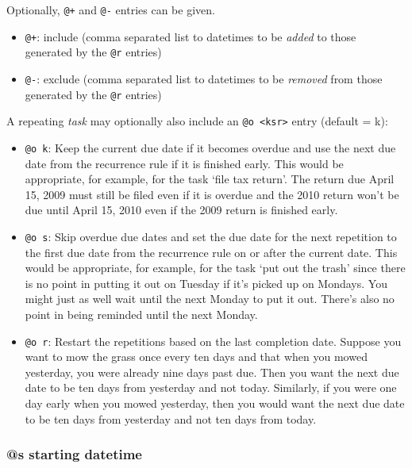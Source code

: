 \documentclass[]{article}
\begin{document}
Optionally, \texttt{@+} and \texttt{@-} entries can be given.

\begin{itemize}
\item
  \texttt{@+}: include (comma separated list to datetimes to be
  \emph{added} to those generated by the \texttt{@r} entries)
\item
  \texttt{@-}: exclude (comma separated list to datetimes to be
  \emph{removed} from those generated by the \texttt{@r} entries)
\end{itemize}

A repeating \emph{task} may optionally also include an
\texttt{@o \textless{}k\textbar{}s\textbar{}r\textgreater{}} entry
(default = k):

\begin{itemize}
\item
  \texttt{@o k}: Keep the current due date if it becomes overdue and use
  the next due date from the recurrence rule if it is finished early.
  This would be appropriate, for example, for the task `file tax
  return'. The return due April 15, 2009 must still be filed even if it
  is overdue and the 2010 return won't be due until April 15, 2010 even
  if the 2009 return is finished early.
\item
  \texttt{@o s}: Skip overdue due dates and set the due date for the
  next repetition to the first due date from the recurrence rule on or
  after the current date. This would be appropriate, for example, for
  the task `put out the trash' since there is no point in putting it out
  on Tuesday if it's picked up on Mondays. You might just as well wait
  until the next Monday to put it out. There's also no point in being
  reminded until the next Monday.
\item
  \texttt{@o r}: Restart the repetitions based on the last completion
  date. Suppose you want to mow the grass once every ten days and that
  when you mowed yesterday, you were already nine days past due. Then
  you want the next due date to be ten days from yesterday and not
  today. Similarly, if you were one day early when you mowed yesterday,
  then you would want the next due date to be ten days from yesterday
  and not ten days from today.
\end{itemize}

\subsubsection{@s starting datetime}
\end{document}
